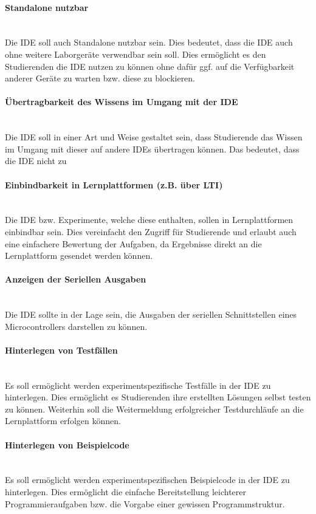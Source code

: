 \paragraph{Standalone nutzbar} \mbox{} \\
Die IDE soll auch Standalone nutzbar sein. Dies bedeutet, dass die IDE auch ohne weitere Laborgeräte verwendbar sein soll. Dies ermöglicht es den Studierenden die IDE nutzen zu können ohne dafür ggf. auf die Verfügbarkeit anderer Geräte zu warten bzw. diese zu blockieren.

\paragraph{Übertragbarkeit des Wissens im Umgang mit der IDE} \mbox{} \\
Die IDE soll in einer Art und Weise gestaltet sein, dass Studierende das Wissen im Umgang mit dieser auf andere IDEs übertragen können. Das bedeutet, dass die IDE nicht zu 

\paragraph{Einbindbarkeit in Lernplattformen (z.B. über LTI)} \mbox{} \\
Die IDE bzw. Experimente, welche diese enthalten, sollen in Lernplattformen einbindbar sein. Dies vereinfacht den Zugriff für Studierende und erlaubt auch eine einfachere Bewertung der Aufgaben, da Ergebnisse direkt an die Lernplattform gesendet werden können.

\paragraph{Anzeigen der Seriellen Ausgaben} \mbox{} \\
Die IDE sollte in der Lage sein, die Ausgaben der seriellen Schnittstellen eines Microcontrollers darstellen zu können.

\paragraph{Hinterlegen von Testfällen} \mbox{} \\
Es soll ermöglicht werden experimentspezifische Testfälle in der IDE zu hinterlegen. Dies ermöglicht es Studierenden ihre erstellten Lösungen selbst testen zu können. Weiterhin soll die Weitermeldung erfolgreicher Testdurchläufe an die Lernplattform erfolgen können.

\paragraph{Hinterlegen von Beispielcode} \mbox{} \\
Es soll ermöglicht werden experimentspezifischen Beispielcode in der IDE zu hinterlegen. Dies ermöglicht die einfache Bereitstellung leichterer Programmieraufgaben bzw. die Vorgabe einer gewissen Programmstruktur.